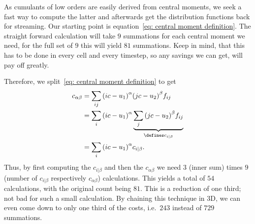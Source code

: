 
As cumulants of low orders are easily derived from central moments, we seek a fast way to compute the latter and afterwards get the distribution functions back for streaming.
Our starting point is equation~\eqref{eq: central moment definition}.
The straight forward calculation will take $9$ summations for each central moment we need, for the full set of $9$ this will yield $81$ summations.
Keep in mind, that this has to be done in every cell and every timestep, so any savings we can get, will pay off greatly.

Therefore, we split~\eqref{eq: central moment definition} to get
\begin{equation}
  \begin{aligned}
    c_{\alpha\beta}
    & = \sum_{ij} {\left(ic-u_1\right)}^\alpha {\left(jc-u_2\right)}^\beta f_{ij} \\
    & = \sum_{i} {\left(ic-u_1\right)}^\alpha \underbrace{\sum_{j} {\left(jc-u_2\right)}^\beta f_{ij}}_{\defines c_{i|\beta}} \\
    & = \sum_{i} {\left(ic-u_1\right)}^\alpha c_{i|\beta}.
  \end{aligned}
\end{equation}
Thus, by first computing the $c_{i|\beta}$ and then the $c_{\alpha\beta}$ we need $3$ (inner sum) times $9$ (number of  $c_{i|\beta}$ respectively $c_{\alpha\beta}$) calculations.
This yields a total of $54$ calculations, with the original count being $81$.
This is a reduction of one third; not bad for such a small calculation.
By chaining this technique in 3D, we can even come down to only one third of the costs, i.e.\ $243$ instead of $729$ summations.

